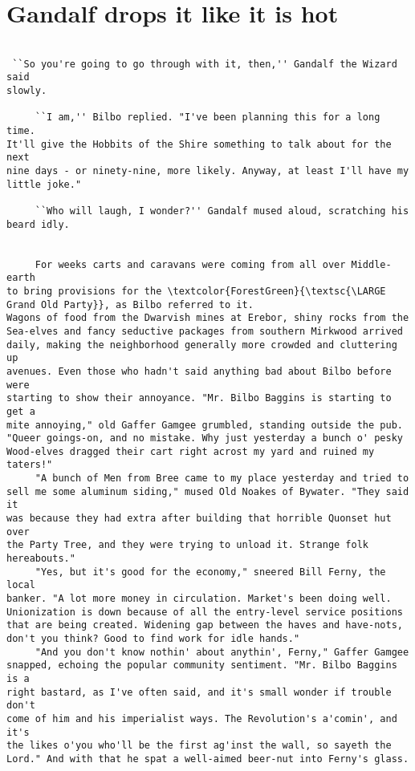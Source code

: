 \chapter[Hobbit Party]{Gandalf drops it like it is hot}
\begin{verbatim}

 ``So you're going to go through with it, then,'' Gandalf the Wizard said 
slowly.

     ``I am,'' Bilbo replied. "I've been planning this for a long time. 
It'll give the Hobbits of the Shire something to talk about for the next 
nine days - or ninety-nine, more likely. Anyway, at least I'll have my 
little joke."

     ``Who will laugh, I wonder?'' Gandalf mused aloud, scratching his 
beard idly.


     For weeks carts and caravans were coming from all over Middle-earth 
to bring provisions for the \textcolor{ForestGreen}{\textsc{\LARGE Grand Old Party}}, as Bilbo referred to it. 
Wagons of food from the Dwarvish mines at Erebor, shiny rocks from the 
Sea-elves and fancy seductive packages from southern Mirkwood arrived 
daily, making the neighborhood generally more crowded and cluttering up 
avenues. Even those who hadn't said anything bad about Bilbo before were 
starting to show their annoyance. "Mr. Bilbo Baggins is starting to get a 
mite annoying," old Gaffer Gamgee grumbled, standing outside the pub. 
"Queer goings-on, and no mistake. Why just yesterday a bunch o' pesky 
Wood-elves dragged their cart right acrost my yard and ruined my taters!"
     "A bunch of Men from Bree came to my place yesterday and tried to 
sell me some aluminum siding," mused Old Noakes of Bywater. "They said it 
was because they had extra after building that horrible Quonset hut over 
the Party Tree, and they were trying to unload it. Strange folk 
hereabouts."
     "Yes, but it's good for the economy," sneered Bill Ferny, the local 
banker. "A lot more money in circulation. Market's been doing well. 
Unionization is down because of all the entry-level service positions 
that are being created. Widening gap between the haves and have-nots, 
don't you think? Good to find work for idle hands."
     "And you don't know nothin' about anythin', Ferny," Gaffer Gamgee 
snapped, echoing the popular community sentiment. "Mr. Bilbo Baggins is a 
right bastard, as I've often said, and it's small wonder if trouble don't 
come of him and his imperialist ways. The Revolution's a'comin', and it's 
the likes o'you who'll be the first ag'inst the wall, so sayeth the 
Lord." And with that he spat a well-aimed beer-nut into Ferny's glass.


\end{verbatim}
